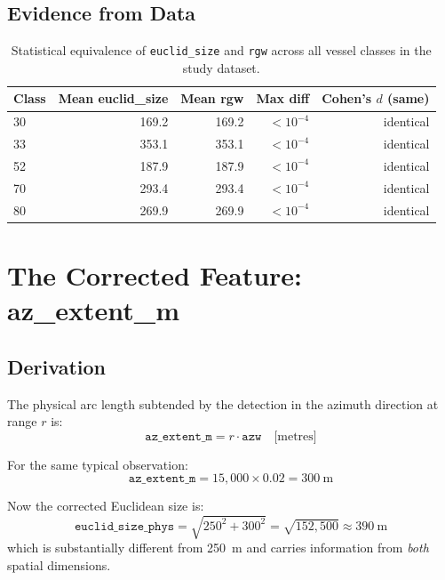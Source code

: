 \documentclass[journal]{IEEEtran}
\begin{document}
\subsection{Evidence from Data}

\begin{table}[H]
\centering
\caption{Statistical equivalence of \texttt{euclid\_size} and \texttt{rgw}
         across all vessel classes in the study dataset.}
\begin{tabular}{lrrrr}
\toprule
\textbf{Class} & \textbf{Mean euclid\_size} & \textbf{Mean rgw} & \textbf{Max diff} & \textbf{Cohen's $d$ (same)} \\
\midrule
30 & 169.2 & 169.2 & $<10^{-4}$ & identical \\
33 & 353.1 & 353.1 & $<10^{-4}$ & identical \\
52 & 187.9 & 187.9 & $<10^{-4}$ & identical \\
70 & 293.4 & 293.4 & $<10^{-4}$ & identical \\
80 & 269.9 & 269.9 & $<10^{-4}$ & identical \\
\bottomrule
\end{tabular}
\end{table}

\section{The Corrected Feature: az\_extent\_m}
\label{sec:az_extent}

\subsection{Derivation}

The physical arc length subtended by the detection in the azimuth direction
at range $r$ is:
\begin{equation}
  \boxed{\texttt{az\_extent\_m} = r \cdot \texttt{azw} \quad \text{[metres]}}
  \label{eq:az_correct}
\end{equation}

For the same typical observation:
\begin{equation}
  \texttt{az\_extent\_m} = 15{,}000 \times 0.02 = 300~\text{m}
\end{equation}

Now the corrected Euclidean size is:
\begin{equation}
  \texttt{euclid\_size\_phys} = \sqrt{250^2 + 300^2} = \sqrt{152{,}500} \approx 390~\text{m}
\end{equation}
which is substantially different from 250~m and carries information from
\emph{both} spatial dimensions.
\end{document}
